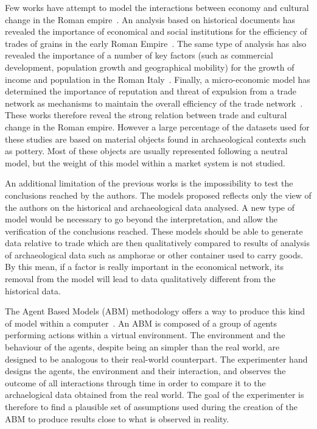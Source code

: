 \documentclass{wscpaperproc}
\begin{document}
Few works have attempt to model the interactions between economy and cultural change in the Roman empire~\cite{terpstra_trade_2011,kessler_organization_2007,scheidel_model_2007}. An analysis based on historical documents has revealed the importance of economical and social institutions for the efficiency of trades of grains in the early Roman Empire~\cite{kessler_organization_2007}. The same type of analysis has also revealed the importance of a number of key factors (such as commercial development, population growth and geographical mobility) for the growth of income and population in the Roman Italy~\cite{scheidel_model_2007}. Finally, a micro-economic model has determined the importance of reputation and threat of expulsion from a trade network as mechanisms to maintain the overall efficiency of the trade network~\cite{terpstra_trade_2011}. These works therefore reveal the strong relation between trade and cultural change in the Roman empire. However a large percentage of the datasets used for these studies are based on material objects found in archaeological contexts such as pottery. Most of these objects are usually represented following a neutral model, but the weight of this model within a market system is not studied.

An additional limitation of the previous works is the impossibility to test the conclusions reached by the authors. The models proposed reflects only the view of the authors on the historical and archaeological data analysed. A new type of model would be necessary to go beyond the interpretation, and allow the verification of the conclusions reached. These models should be able to generate data relative to trade which are then qualitatively compared to results of analysis of archaeological data such as amphorae or other container used to carry goods. By this mean, if a factor is really important in the economical network, its removal from the model will lead to data qualitatively different from the historical data. 


The Agent Based Models (ABM) methodology offers a way to produce this kind of model within a computer~\cite{lake_trends_2014}. An ABM is composed of a group of agents performing actions within a virtual environment. The environment and the behaviour of the agents, despite being an simpler than the real world, are designed to be analogous to their real-world counterpart. The experimenter hand designs the agents, the environment and their interaction, and observes the outcome of all interactions through time in order to compare it to the archaelogical data obtained from the real world. The goal of the experimenter is therefore to find a plausible set of assumptions used during the creation of the ABM to produce results close to what is observed in reality.
\end{document}
